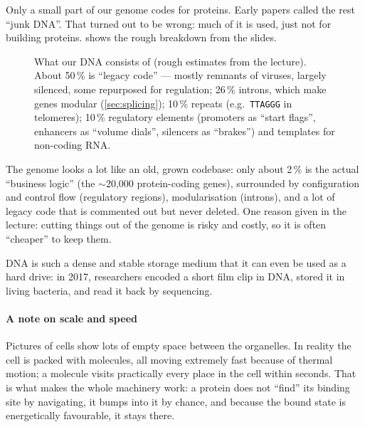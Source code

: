 \documentclass[11pt, oneside]{book}
\newcommand{\seq}[1]{\texttt{#1}}
\begin{document}
Only a small part of our genome codes for proteins. Early papers called the
rest ``junk DNA''. That turned out to be wrong: much of it is used, just not
for building proteins.  shows the rough breakdown from the
slides.

\begin{figure}[htbp]
\centering
{}
\caption{What our DNA consists of (rough estimates from the lecture). About
50\,\% is ``legacy code'' --- mostly remnants of viruses, largely silenced,
some repurposed for regulation; 26\,\% introns, which make genes modular
(\cref{sec:splicing}); 10\,\% repeats (e.g.\ \seq{TTAGGG} in telomeres); 10\,\%
regulatory elements (promoters as ``start flags'', enhancers as ``volume
dials'', silencers as ``brakes'') and templates for non-coding RNA.}
\label{fig:genome}
\end{figure}

\begin{intbox}
The genome looks a lot like an old, grown codebase: only about 2\,\% is the
actual ``business logic'' (the $\sim$20,000 protein-coding genes), surrounded
by configuration and control flow (regulatory regions), modularisation
(introns), and a lot of legacy code that is commented out but never deleted.
One reason given in the lecture: cutting things out of the genome is risky
and costly, so it is often ``cheaper'' to keep them.
\end{intbox}

DNA is such a dense and stable storage medium that it can even be used as a
hard drive: in 2017, researchers encoded a short film clip in DNA, stored it
in living bacteria, and read it back by sequencing.

\paragraph{A note on scale and speed}
Pictures of cells show lots of empty space between the organelles. In
reality the cell is packed with molecules, all moving extremely fast because
of thermal motion; a molecule visits practically every place in the cell
within seconds. That is what makes the whole machinery work: a protein does
not ``find'' its binding site by navigating, it bumps into it by chance, and
because the bound state is energetically favourable, it stays there.
\end{document}
